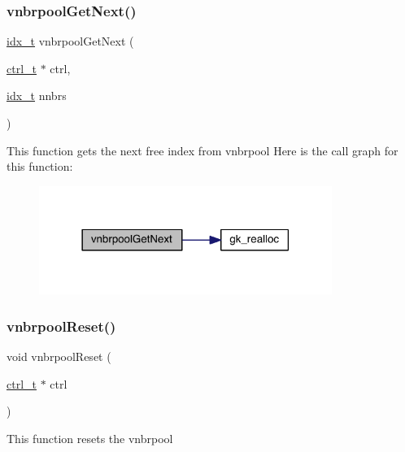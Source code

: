 \subsubsection{\texorpdfstring{vnbrpool\+Get\+Next()}{vnbrpoolGetNext()}}
{\footnotesize\ttfamily \hyperlink{a00876_aaa5262be3e700770163401acb0150f52}{idx\+\_\+t} vnbrpool\+Get\+Next (\begin{DoxyParamCaption}\item[{\hyperlink{a00742}{ctrl\+\_\+t} $\ast$}]{ctrl,  }\item[{\hyperlink{a00876_aaa5262be3e700770163401acb0150f52}{idx\+\_\+t}}]{nnbrs }\end{DoxyParamCaption})}

This function gets the next free index from vnbrpool Here is the call graph for this function\+:\nopagebreak
\begin{figure}[H]
\begin{center}
\leavevmode
\includegraphics[width=270pt]{a00981_a371b41152c6e40d6866b357a4ffee5f1_cgraph}
\end{center}
\end{figure}
\mbox{\label{a00981_a0eac0ea6853b8ee210cbd739e17782aa}} 
\subsubsection{\texorpdfstring{vnbrpool\+Reset()}{vnbrpoolReset()}}
{\footnotesize\ttfamily void vnbrpool\+Reset (\begin{DoxyParamCaption}\item[{\hyperlink{a00742}{ctrl\+\_\+t} $\ast$}]{ctrl }\end{DoxyParamCaption})}

This function resets the vnbrpool \mbox{\label{a00981_a555f2ae3f4e5561c9b1ef592bf0f8476}} 
